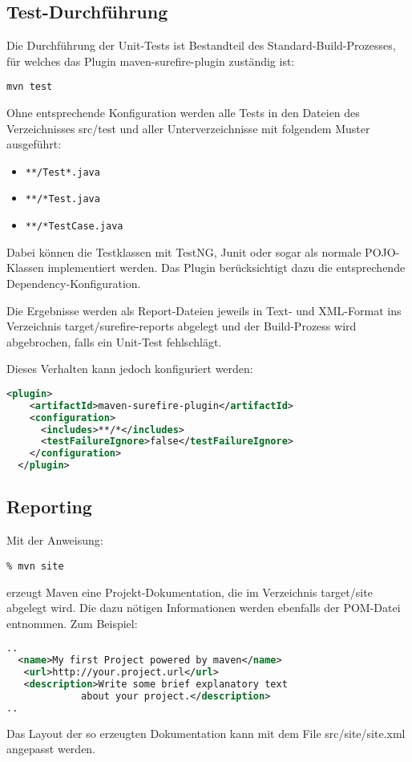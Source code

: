 \subsection{Test-Durchführung}
Die Durchführung der Unit-Tests ist Bestandteil des
Standard-Build-Prozesses, für welches das Plugin
maven-surefire-plugin zuständig ist:
\begin{lstlisting}
mvn test
\end{lstlisting}
Ohne entsprechende Konfiguration werden alle Tests in den Dateien des
Verzeichnisses src/test und aller Unterverzeichnisse mit folgendem
Muster ausgeführt:
\begin{itemize}
\item \verb+**/Test*.java+
\item \verb+**/*Test.java+
\item \verb+**/*TestCase.java+
\end{itemize}
Dabei können die Testklassen mit TestNG, Junit oder sogar
als normale POJO-Klassen
implementiert werden. Das Plugin berücksichtigt dazu die entsprechende
Dependency-Konfiguration.

Die Ergebnisse werden als
Report-Dateien jeweils in Text- und XML-Format ins Verzeichnis
target/surefire-reports abgelegt und der Build-Prozess wird
abgebrochen, falls ein Unit-Test fehlschlägt.

Dieses Verhalten kann jedoch konfiguriert werden:
\begin{lstlisting}[language=xml,
  morekeywords={plugin,groupId,artifactId,configuration,testFailureIgnore,includes}]
  <plugin>
    <artifactId>maven-surefire-plugin</artifactId>
    <configuration>
      <includes>**/*</includes>
      <testFailureIgnore>false</testFailureIgnore>
    </configuration>
  </plugin>
\end{lstlisting}
%
\newslide
\subsection{Reporting}
Mit der Anweisung:
\begin{lstlisting}
% mvn site
\end{lstlisting}
erzeugt Maven eine Projekt-Dokumentation, die im Verzeichnis target/site
abgelegt wird. Die dazu nötigen Informationen werden ebenfalls der
POM-Datei entnommen. Zum Beispiel:
\begin{lstlisting}[language=xml,morekeywords={name,url,description}]
..
  <name>My first Project powered by maven</name>
   <url>http://your.project.url</url>
   <description>Write some brief explanatory text
             about your project.</description>
..
\end{lstlisting}
Das Layout der so erzeugten Dokumentation
kann mit dem File src/site/site.xml angepasst werden.

